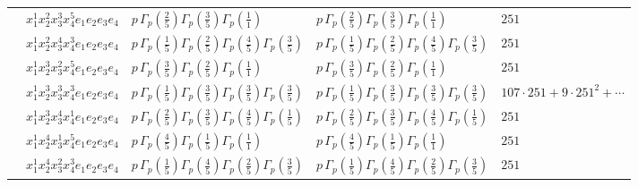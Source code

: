\documentclass[11pt]{article}
\begin{document}
\begin{table}[ht]
{\begin{tabular}{@{}lllll@{}}
 & $x_{1}^{1} x_{2}^{2} x_{3}^{3} x_{4}^{5}  e_{1} e_{2} e_{3} e_{4}$ & $p \, \Gamma_p \left( \frac{2}{5} \right) \Gamma_p \left( \frac{3}{5} \right) \Gamma_p \left( \frac{1}{1} \right)$ & $p \, \Gamma_p \left( \frac{2}{5} \right) \Gamma_p \left( \frac{3}{5} \right) \Gamma_p \left( \frac{1}{1} \right)$ & $251$ \\
 & $x_{1}^{1} x_{2}^{2} x_{3}^{4} x_{4}^{3}  e_{1} e_{2} e_{3} e_{4}$ & $p \, \Gamma_p \left( \frac{1}{5} \right) \Gamma_p \left( \frac{2}{5} \right) \Gamma_p \left( \frac{4}{5} \right) \Gamma_p \left( \frac{3}{5} \right)$ & $p \, \Gamma_p \left( \frac{1}{5} \right) \Gamma_p \left( \frac{2}{5} \right) \Gamma_p \left( \frac{4}{5} \right) \Gamma_p \left( \frac{3}{5} \right)$ & $251$ \\
 & $x_{1}^{1} x_{2}^{3} x_{3}^{2} x_{4}^{5}  e_{1} e_{2} e_{3} e_{4}$ & $p \, \Gamma_p \left( \frac{3}{5} \right) \Gamma_p \left( \frac{2}{5} \right) \Gamma_p \left( \frac{1}{1} \right)$ & $p \, \Gamma_p \left( \frac{3}{5} \right) \Gamma_p \left( \frac{2}{5} \right) \Gamma_p \left( \frac{1}{1} \right)$ & $251$ \\
 & $x_{1}^{1} x_{2}^{3} x_{3}^{3} x_{4}^{3}  e_{1} e_{2} e_{3} e_{4}$ & $p \, \Gamma_p \left( \frac{1}{5} \right) \Gamma_p \left( \frac{3}{5} \right) \Gamma_p \left( \frac{3}{5} \right) \Gamma_p \left( \frac{3}{5} \right)$ & $p \, \Gamma_p \left( \frac{1}{5} \right) \Gamma_p \left( \frac{3}{5} \right) \Gamma_p \left( \frac{3}{5} \right) \Gamma_p \left( \frac{3}{5} \right)$ & $107{\cdot}251{+}9{\cdot}251^{2}{+}\cdots$ \\
 & $x_{1}^{1} x_{2}^{3} x_{3}^{4} x_{4}^{1}  e_{1} e_{2} e_{3} e_{4}$ & $p \, \Gamma_p \left( \frac{2}{5} \right) \Gamma_p \left( \frac{3}{5} \right) \Gamma_p \left( \frac{4}{5} \right) \Gamma_p \left( \frac{1}{5} \right)$ & $p \, \Gamma_p \left( \frac{2}{5} \right) \Gamma_p \left( \frac{3}{5} \right) \Gamma_p \left( \frac{4}{5} \right) \Gamma_p \left( \frac{1}{5} \right)$ & $251$ \\
 & $x_{1}^{1} x_{2}^{4} x_{3}^{1} x_{4}^{5}  e_{1} e_{2} e_{3} e_{4}$ & $p \, \Gamma_p \left( \frac{4}{5} \right) \Gamma_p \left( \frac{1}{5} \right) \Gamma_p \left( \frac{1}{1} \right)$ & $p \, \Gamma_p \left( \frac{4}{5} \right) \Gamma_p \left( \frac{1}{5} \right) \Gamma_p \left( \frac{1}{1} \right)$ & $251$ \\
 & $x_{1}^{1} x_{2}^{4} x_{3}^{2} x_{4}^{3}  e_{1} e_{2} e_{3} e_{4}$ & $p \, \Gamma_p \left( \frac{1}{5} \right) \Gamma_p \left( \frac{4}{5} \right) \Gamma_p \left( \frac{2}{5} \right) \Gamma_p \left( \frac{3}{5} \right)$ & $p \, \Gamma_p \left( \frac{1}{5} \right) \Gamma_p \left( \frac{4}{5} \right) \Gamma_p \left( \frac{2}{5} \right) \Gamma_p \left( \frac{3}{5} \right)$ & $251$ \\

\end{tabular}}
\end{table}
\end{document}
